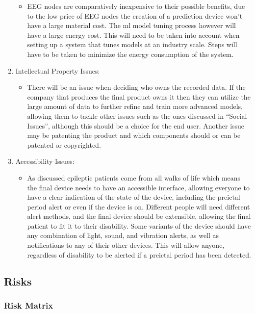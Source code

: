 \documentclass[12pt]{article}
\begin{document}
\begin{enumerate}
    \begin{itemize}
    	 \item EEG nodes are comparatively inexpensive to their possible benefits, due to the low price of EEG nodes the creation of a prediction device won't have a large material cost. The \acrshort{ml} model tuning process however will have a large energy cost. This will need to be taken into account when setting up a system that tunes models at an industry scale. Steps will have to be taken to minimize the energy consumption of the system.
    \end{itemize}
            \item Intellectual Property Issues:
    \begin{itemize}
    	 \item There will be an issue when deciding who owns the recorded data. If the company that produces the final product owns it then they can utilize the large amount of data to further refine and train more advanced models, allowing them to tackle other issues such as the ones discussed in ``Social Issues'', although this should be a choice for the end user. Another issue may be patenting the product and which components should or can be patented or copyrighted.
    \end{itemize}
        \item Accessibility Issues:
    \begin{itemize}
    	 \item As discussed epileptic patients come from all walks of life which means the final device needs to have an accessible interface, allowing everyone to have a clear indication of the state of the device, including the preictal period alert or even if the device is on. Different people will need different alert methods, and the final device should be extensible, allowing the final patient to fit it to their disability. Some variants of the device should have any combination of light, sound, and vibration alerts, as well as notifications to any of their other devices. This will allow anyone, regardless of disability to be alerted if a preictal period has been detected.
    \end{itemize}
\end{enumerate}

\subsection{Risks}

\subsubsection{Risk Matrix}
\end{document}
